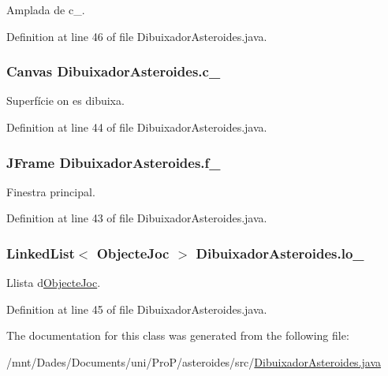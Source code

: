 Amplada de c\+\_\+. 



Definition at line 46 of file Dibuixador\+Asteroides.\+java.

\hypertarget{class_dibuixador_asteroides_a634f3d95d02d08c9d21d2eef2c3bb410}{}
\subsubsection[{c\+\_\+}]{\setlength{\rightskip}{0pt plus 5cm}Canvas Dibuixador\+Asteroides.\+c\+\_\+\hspace{0.3cm}{\ttfamily [private]}}\label{class_dibuixador_asteroides_a634f3d95d02d08c9d21d2eef2c3bb410}


Superfície on es dibuixa. 



Definition at line 44 of file Dibuixador\+Asteroides.\+java.

\hypertarget{class_dibuixador_asteroides_acd1dc7eee6ddda629759fc422566b11b}{}
\subsubsection[{f\+\_\+}]{\setlength{\rightskip}{0pt plus 5cm}J\+Frame Dibuixador\+Asteroides.\+f\+\_\+\hspace{0.3cm}{\ttfamily [private]}}\label{class_dibuixador_asteroides_acd1dc7eee6ddda629759fc422566b11b}


Finestra principal. 



Definition at line 43 of file Dibuixador\+Asteroides.\+java.

\hypertarget{class_dibuixador_asteroides_aafc049ca18d07bf9cf5f61b7e8e1e06f}{}
\subsubsection[{lo\+\_\+}]{\setlength{\rightskip}{0pt plus 5cm}Linked\+List$<$ {\bf Objecte\+Joc} $>$ Dibuixador\+Asteroides.\+lo\+\_\+\hspace{0.3cm}{\ttfamily [private]}}\label{class_dibuixador_asteroides_aafc049ca18d07bf9cf5f61b7e8e1e06f}


Llista d\textquotesingle{}\hyperlink{interface_objecte_joc}{Objecte\+Joc}. 



Definition at line 45 of file Dibuixador\+Asteroides.\+java.



The documentation for this class was generated from the following file\+:\begin{DoxyCompactItemize}
\item 
/mnt/\+Dades/\+Documents/uni/\+Pro\+P/asteroides/src/\hyperlink{_dibuixador_asteroides_8java}{Dibuixador\+Asteroides.\+java}\end{DoxyCompactItemize}
